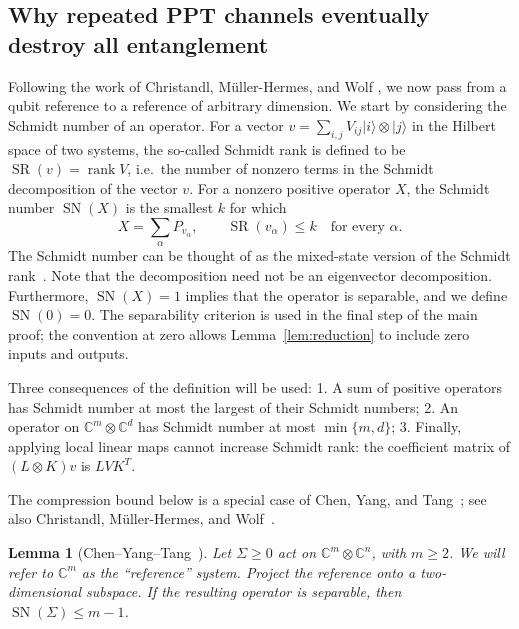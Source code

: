 \documentclass[aps,prl,reprint,superscriptaddress,longbibliography,raggedbottom]{revtex4-2}
\newtheorem{lemma}{Lemma}
\newcommand{\C}{\mathbb C}
\newcommand{\SN}{\operatorname{SN}}
\newcommand{\SR}{\operatorname{SR}}
\newcommand{\ket}[1]{\lvert #1\rangle}
\begin{document}
\subsection*{Why repeated PPT channels eventually destroy all entanglement}
Following the work of Christandl, M\"uller-Hermes, and Wolf \cite{CMHW19}, we now pass from a qubit reference to a reference of arbitrary dimension. We start by considering the Schmidt number of an operator. For a vector $v=\sum_{i,j}V_{ij}\ket i\otimes\ket j$ in the Hilbert space of two systems, the so-called Schmidt rank is defined to be 
$\SR(v)=\operatorname{rank}V$, i.e.\ the number of nonzero terms in the
Schmidt decomposition of the vector $v$. For a nonzero positive operator $X$, the
Schmidt number $\SN(X)$ is the smallest $k$ for which
\begin{equation}\label{eq:sn}
X=\sum_\alpha P_{v_\alpha},\qquad \SR(v_\alpha)\le k
\quad\text{for every }\alpha.
\end{equation}
The Schmidt number can be thought of as the mixed-state version of the Schmidt rank~\cite{TH00}. Note that the
decomposition need not be an eigenvector decomposition. Furthermore,
$\SN(X)=1$ implies that the operator is separable, and we define $\SN(0)=0$.
The separability criterion is used in the final step of the main proof; the
convention at zero allows Lemma~\ref{lem:reduction} to include zero inputs
and outputs.

Three consequences of the definition will be used: 1. A sum of positive
operators has Schmidt number at most the largest of their Schmidt
numbers; 2. An operator on
$\C^m\otimes\C^d$ has Schmidt number at most $\min\{m,d\}$; 
3. Finally, applying local linear maps cannot increase Schmidt rank:
the coefficient matrix of $(L\otimes K)v$ is $LVK^T$.

The compression bound below is a special case of Chen, Yang, and
Tang~\cite[Lemma~15(i)]{CYT17}; see also Christandl, M\"uller-Hermes,
and Wolf~\cite[Theorem~A.2]{CMHW19}. 

\begin{lemma}[{Chen--Yang--Tang~\cite{CYT17}}]\label{lem:lift}
Let $\Sigma\ge0$ act on $\C^m\otimes\C^n$, with $m\ge2$. We will refer to $\C^m$ as the ``reference'' system.
Project the reference onto a two-dimensional subspace. If the resulting
operator is separable, then $\SN(\Sigma)\le m-1$.
\end{lemma}
\end{document}
